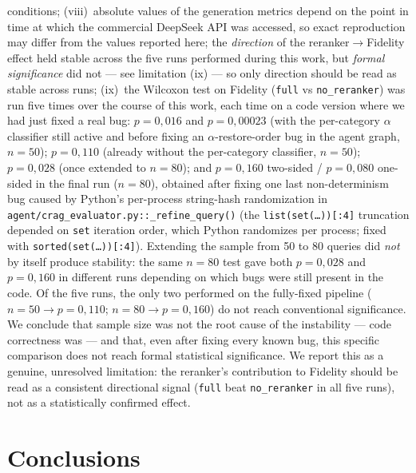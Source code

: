 \documentclass[runningheads]{llncs}
\begin{document}
conditions; (viii)~absolute values of the generation metrics depend on the point in time at which the commercial DeepSeek API was accessed, so exact reproduction may differ from the values reported here; the \emph{direction} of the reranker$\rightarrow$Fidelity effect held stable across the five runs performed during this work, but \emph{formal significance} did not — see limitation (ix) — so only direction should be read as stable across runs; (ix)~the Wilcoxon test on Fidelity (\texttt{full} vs \texttt{no\_reranker}) was run five times over the course of this work, each time on a code version where we had just fixed a real bug: $p{=}0{,}016$ and $p{=}0{,}00023$ (with the per-category $\alpha$ classifier still active and before fixing an $\alpha$-restore-order bug in the agent graph, $n{=}50$); $p{=}0{,}110$ (already without the per-category classifier, $n{=}50$); $p{=}0{,}028$ (once extended to $n{=}80$); and $p{=}0{,}160$ two-sided / $p{=}0{,}080$ one-sided in the final run ($n{=}80$), obtained after fixing one last non-determinism bug caused by Python's per-process string-hash randomization in \texttt{agent/crag\_evaluator.py::\_refine\_query()} (the \texttt{list(set(\ldots))[:4]} truncation depended on \texttt{set} iteration order, which Python randomizes per process; fixed with \texttt{sorted(set(\ldots))[:4]}). Extending the sample from 50 to 80 queries did \emph{not} by itself produce stability: the same $n{=}80$ test gave both $p{=}0{,}028$ and $p{=}0{,}160$ in different runs depending on which bugs were still present in the code. Of the five runs, the only two performed on the fully-fixed pipeline ($n{=}50{\to}p{=}0{,}110$; $n{=}80{\to}p{=}0{,}160$) do not reach conventional significance. We conclude that sample size was not the root cause of the instability — code correctness was — and that, even after fixing every known bug, this specific comparison does not reach formal statistical significance. We report this as a genuine, unresolved limitation: the reranker's contribution to Fidelity should be read as a consistent directional signal (\texttt{full} beat \texttt{no\_reranker} in all five runs), not as a statistically confirmed effect.

\section{Conclusions}
\label{sec:conclusion}
\end{document}
